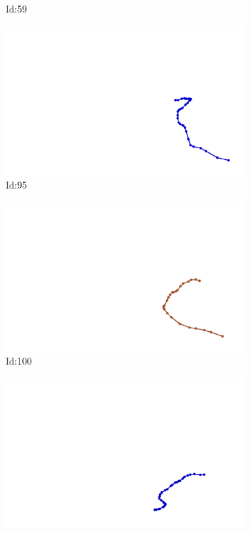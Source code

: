 \documentclass[12pt,twoside]{report}
\begin{document}
\begin{figure}
\begin{subfigure}[b]{0.20\textwidth}
\caption{Id:59}
\end{subfigure}
\begin{subfigure}[b]{0.20\textwidth}
\centering
\includegraphics[width=\textwidth]{../trajectories/95.png}
\caption{Id:95}
\end{subfigure}
\begin{subfigure}[b]{0.20\textwidth}
\centering
\includegraphics[width=\textwidth]{../trajectories/100.png}
\caption{Id:100}
\end{subfigure}
\begin{subfigure}[b]{0.20\textwidth}
\centering
\includegraphics[width=\textwidth]{../trajectories/109.png}

\end{subfigure}
\end{figure}
\end{document}
